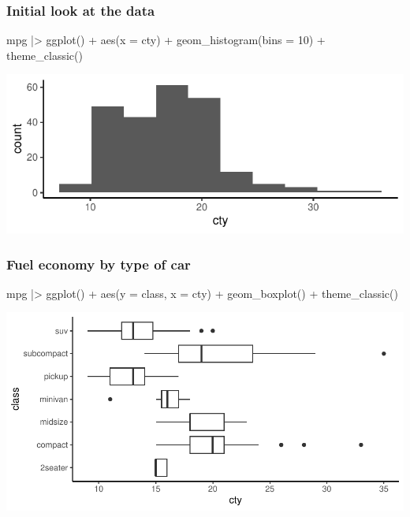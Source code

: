 \documentclass[a4paper]{article}\usepackage[]{graphicx}\usepackage[]{xcolor}
\makeatletter
\def\maxwidth{ %
  \ifdim\Gin@nat@width>\linewidth
    \linewidth
  \else
    \Gin@nat@width
  \fi
}
\makeatother
\begin{document}
\subsubsection{Initial look at the data}
\begin{Schunk}
\begin{Sinput}
mpg |> ggplot() + 
  aes(x = cty) + 
  geom_histogram(bins = 10) +
  theme_classic()
\end{Sinput}


{\centering \includegraphics[width=\maxwidth]{figure/listings-unnamed-chunk-373-1} 

}

\end{Schunk}
\subsubsection{Fuel economy by type of car}
\begin{Schunk}
\begin{Sinput}
mpg |> ggplot() + 
  aes(y = class, x = cty) + 
  geom_boxplot() +
  theme_classic()
\end{Sinput}


{\centering \includegraphics[width=\maxwidth]{figure/listings-unnamed-chunk-374-1} 

}

\end{Schunk}
\end{document}
